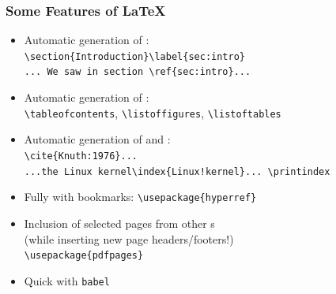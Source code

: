 \begin{frame}[fragile]
\begin{columns}
\begin{column}{.58\textwidth}
\end{column}
\end{columns}
\end{frame}




\begin{frame}[fragile]
\lstset{basicstyle=\ttfamily}
\frametitle{Some Features of \LaTeX}
\begin{itemize}
\item<+> Automatic generation of :\\
\lstinline|\section{Introduction}\label{sec:intro}|\\
\lstinline|... We saw in section \ref{sec:intro}...|
\item<+> Automatic generation of :\\
\lstinline[texcs={tableofcontents}]|\tableofcontents|, \lstinline[texcs={listoffigures}]|\listoffigures|,  \lstinline[texcs={listoftables}]|\listoftables|
\item<+> Automatic generation of  and :\\
\lstinline|\cite{Knuth:1976}...|\\
\lstinline[moretexcs={printindex}]|...the Linux kernel\index{Linux!kernel}... \printindex|\\
\item<+> Fully   with bookmarks: \lstinline|\usepackage{hyperref}|
\item<+> Inclusion of selected pages from other s\\(while inserting new page headers/footers!)\\
\lstinline|\usepackage{pdfpages}|\\
\lstinline||
\item<+> Quick  with \texttt{babel}
\end{itemize}
\end{frame}


